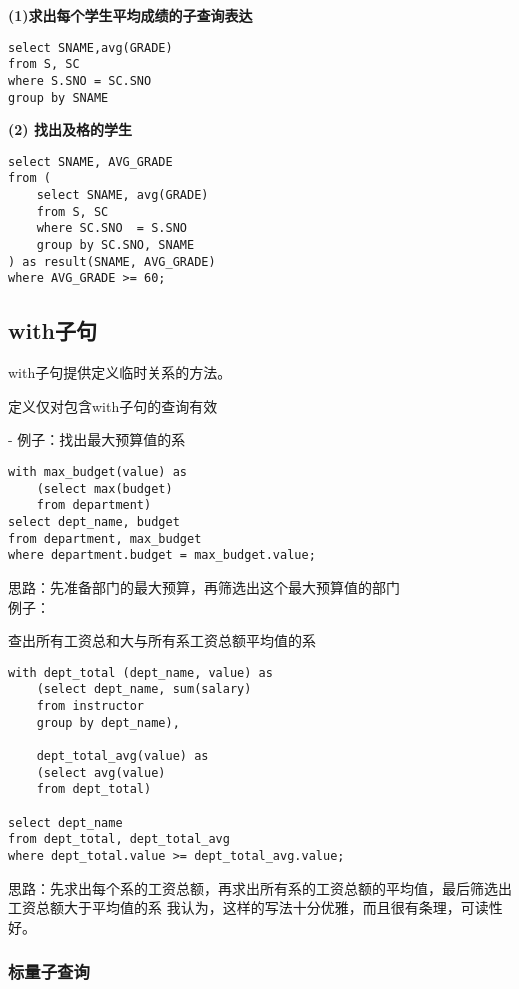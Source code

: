 \documentclass{article}        %
\begin{document}
\textbf{(1)求出每个学生平均成绩的子查询表达}
\begin{verbatim} 
select SNAME,avg(GRADE) 
from S, SC 
where S.SNO = SC.SNO 
group by SNAME 
\end{verbatim}

\textbf{(2) 找出及格的学生}

\begin{verbatim} 
select SNAME, AVG_GRADE 
from ( 
    select SNAME, avg(GRADE) 
    from S, SC 
    where SC.SNO  = S.SNO 
    group by SC.SNO, SNAME 
) as result(SNAME, AVG_GRADE) 
where AVG_GRADE >= 60; 
\end{verbatim}

\subsection{with子句}

with子句提供定义临时关系的方法。

定义仅对包含with子句的查询有效

- 例子：找出最大预算值的系 

\begin{verbatim} 
with max_budget(value) as 
    (select max(budget) 
    from department) 
select dept_name, budget 
from department, max_budget 
where department.budget = max_budget.value;
\end{verbatim}

思路：先准备部门的最大预算，再筛选出这个最大预算值的部门 \\ 

例子：

查出所有工资总和大与所有系工资总额平均值的系

\begin{verbatim}  
with dept_total (dept_name, value) as 
    (select dept_name, sum(salary)
    from instructor 
    group by dept_name), 

    dept_total_avg(value) as 
    (select avg(value)
    from dept_total)

select dept_name 
from dept_total, dept_total_avg 
where dept_total.value >= dept_total_avg.value;
\end{verbatim}

思路：先求出每个系的工资总额，再求出所有系的工资总额的平均值，最后筛选出工资总额大于平均值的系
我认为，这样的写法十分优雅，而且很有条理，可读性好。

\subsubsection{标量子查询}
\end{document}
